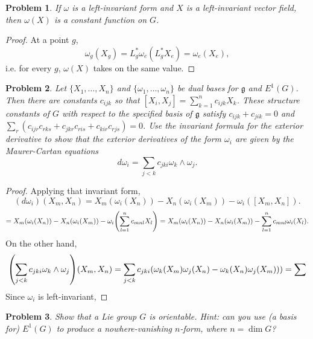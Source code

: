 \documentclass{article}
\newtheorem{plm}{Problem}
\begin{document}
\begin{plm}
  If $\omega$ is a left-invariant form and $X$ is a left-invariant vector field, then $\omega(X)$ is a constant function on $G$.
\end{plm}

\begin{proof}
  At a point $g$,
  \[
    \omega_{g}(X_{g}) = L_{g}^{*}\omega_{e}(L_{g}^{*}X_{e}) = \omega_{e}(X_{e}),
  \]
  i.e. for every $g$, $\omega(X)$ takes on the same value.
\end{proof}

\begin{plm}
  Let $\{X_{1}, \ldots, X_{n}\}$ and $\{\omega_{1}, \ldots, \omega_{n}\}$ be dual bases for $\mathfrak{g}$ and $E^{1}(G)$.
  Then there are constants $c_{ijk}$ so that $[X_{i}, X_{j}] = \sum_{k = 1}^{n}c_{ijk}X_{k}$.
  These \textit{structure constants} of $G$ with respect to the specified basis of $\mathfrak{g}$ satisfy $c_{ijk} + c_{jik} = 0$
  and $\sum_{r}(c_{ijr}c_{rks} + c_{jkr}c_{ris} + c_{kir}c_{rjs}) = 0$.
  Use the invariant formula for the exterior derivative to show that the exterior derivatives of the form $\omega_{i}$
  are given by the \textit{Maurer-Cartan} equations
  \[
    d\omega_{i} = \sum_{j < k}c_{jki}\omega_{k} \wedge \omega_{j}.
  \]
\end{plm}

\begin{proof} %
  Applying that invariant form,
  \[
    (d\omega_{i})(X_{m}, X_{n}) = X_{m}(\omega_{i}(X_{n})) - X_{n}(\omega_{i}(X_{m})) - \omega_{i}([X_{m}, X_{n}]).
  \]
  \[
    = X_{m}(\omega_{i}(X_{n})) - X_{n}(\omega_{i}(X_{m})) - \omega_{i}\qty(\sum_{l = 1}^{n}c_{mnl}X_{l})
    = X_{m}(\omega_{i}(X_{n})) - X_{n}(\omega_{i}(X_{m})) - \sum_{l = 1}^{n}c_{mnl}\omega_{i}\qty(X_{l}).
  \]
  On the other hand,
  \[
    \qty(\sum_{j < k}c_{jki}\omega_{k} \wedge \omega_{j})(X_{m}, X_{n})
    = \sum_{j < k}c_{jki}\qty(\omega_{k}(X_{m})\omega_{j}(X_{n}) - \omega_{k}(X_{n})\omega_{j}(X_{m})))
    = \sum_{}
  \]
  Since $\omega_{i}$ is left-invariant, %
\end{proof}

\begin{plm}
  Show that a Lie group $G$ is orientable. Hint: can you use (a basis for) $E^{1}(G)$ to produce a nowhere-vanishing $n$-form,
  where $n = \dim G$?
\end{plm}
\end{document}
